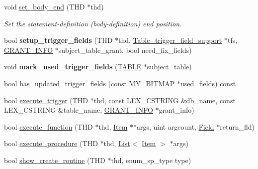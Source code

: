 \begin{DoxyCompactItemize}
\mbox{\label{classsp__head_a31a37a7536ba117e27a2341303fcc3ee}} 
void \mbox{\hyperlink{classsp__head_a31a37a7536ba117e27a2341303fcc3ee}{set\+\_\+body\+\_\+end}} (T\+HD $\ast$thd)
\begin{DoxyCompactList}\small\item\em Set the statement-\/definition (body-\/definition) end position. \end{DoxyCompactList}\item 
\mbox{\label{classsp__head_a294892d6f3a47715b6eb7fa6ff35fff4}} 
bool {\bfseries setup\+\_\+trigger\+\_\+fields} (T\+HD $\ast$thd, \mbox{\hyperlink{classTable__trigger__field__support}{Table\+\_\+trigger\+\_\+field\+\_\+support}} $\ast$tfs, \mbox{\hyperlink{structGRANT__INFO}{G\+R\+A\+N\+T\+\_\+\+I\+N\+FO}} $\ast$subject\+\_\+table\+\_\+grant, bool need\+\_\+fix\+\_\+fields)
\item 
\mbox{\label{classsp__head_a810d8cc16110a89c0a6755450bf981e6}} 
void {\bfseries mark\+\_\+used\+\_\+trigger\+\_\+fields} (\mbox{\hyperlink{structTABLE}{T\+A\+B\+LE}} $\ast$subject\+\_\+table)
\item 
bool \mbox{\hyperlink{classsp__head_a2b7d48622761c9aef8c72a322791d771}{has\+\_\+updated\+\_\+trigger\+\_\+fields}} (const M\+Y\+\_\+\+B\+I\+T\+M\+AP $\ast$used\+\_\+fields) const
\item 
bool \mbox{\hyperlink{classsp__head_abd450e9d13f6a39c7b7477ba4b12092f}{execute\+\_\+trigger}} (T\+HD $\ast$thd, const L\+E\+X\+\_\+\+C\+S\+T\+R\+I\+NG \&db\+\_\+name, const L\+E\+X\+\_\+\+C\+S\+T\+R\+I\+NG \&table\+\_\+name, \mbox{\hyperlink{structGRANT__INFO}{G\+R\+A\+N\+T\+\_\+\+I\+N\+FO}} $\ast$grant\+\_\+info)
\item 
bool \mbox{\hyperlink{classsp__head_a1c125eeeef415da5d45fdf16de43ecb7}{execute\+\_\+function}} (T\+HD $\ast$thd, \mbox{\hyperlink{classItem}{Item}} $\ast$$\ast$args, uint argcount, \mbox{\hyperlink{classField}{Field}} $\ast$return\+\_\+fld)
\item 
bool \mbox{\hyperlink{classsp__head_a525a0ec61c3707d2c1be6c6a56d8dd66}{execute\+\_\+procedure}} (T\+HD $\ast$thd, \mbox{\hyperlink{classList}{List}}$<$ \mbox{\hyperlink{classItem}{Item}} $>$ $\ast$args)
\item 
bool \mbox{\hyperlink{classsp__head_a3e01f461cd612f8d76b5990b874af7b5}{show\+\_\+create\+\_\+routine}} (T\+HD $\ast$thd, enum\+\_\+sp\+\_\+type type)
\item 
$$
\end{DoxyCompactItemize}
